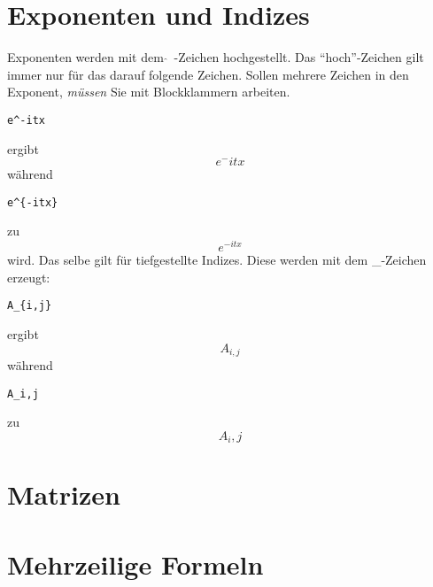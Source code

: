 \section{Exponenten und Indizes}

Exponenten werden mit dem $\hat{ }$\ -Zeichen hochgestellt. Das "`hoch"'-Zeichen gilt immer nur für das darauf folgende Zeichen. Sollen mehrere Zeichen in den Exponent, \emph{müssen} Sie mit Blockklammern arbeiten.
\begin{verbatim}
e^-itx
\end{verbatim}
ergibt
\begin{equation}
e^-itx
\end{equation}
während
\begin{verbatim}
e^{-itx}
\end{verbatim}
zu 
\begin{equation}
e^{-itx}
\end{equation}
wird. Das selbe gilt für tiefgestellte Indizes. Diese werden mit dem \_-Zeichen erzeugt:
\begin{verbatim}
A_{i,j}
\end{verbatim}
ergibt
\begin{equation}
A_{i,j}
\end{equation}
während 
\begin{verbatim}
A_i,j
\end{verbatim}
zu
\begin{equation}
A_i,j
\end{equation}



\section{Matrizen}


\section{Mehrzeilige Formeln}





